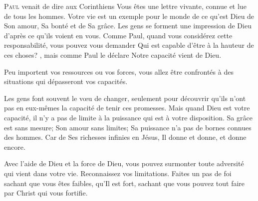 \jrnlmonth




\lettrine{P}{aul} venait de dire aux Corinthiens\frcolon{} 
 \Og Vous êtes une lettre vivante, connue et lue de tous les hommes. \Fg{}
 Votre vie est un exemple pour le monde de ce qu'est Dieu \ocadr de Son amour,
 Sa bonté et de Sa grâce.
 Les gens se forment une impression de Dieu d'après ce qu'ils voient en vous.
 Comme Paul, quand vous considérez cette responsabilité, 
 vous pouvez vous demander\frcolon{} 
 \Og Qui est capable d'être à la hauteur de ces choses? \Fg{},
 mais  comme Paul le déclare\frcolon{} 
 \Og Notre capacité vient de Dieu. \Fg{}

Peu importent vos ressources ou vos forces,
 vous allez être confrontés à des situations qui dépasseront vos capacités.


Les gens font souvent le v\oe{}u de changer, seulement pour découvrir
 qu'ils n'ont pas en eux-mêmes la capacité de tenir ces promesses.
 Mais quand Dieu est votre capacité, il n'y a pas de limite à la puissance
 qui est à votre disposition.
 Sa grâce est sans mesure; Son amour sans limites;
 Sa puissance n'a pas de bornes connues des hommes.
 Car de Ses richesses infinies en Jésus, Il donne et donne, et donne encore.

Avec l'aide de Dieu et la force de Dieu, vous pouvez surmonter
 toute adversité qui vient dans votre vie. Reconnaissez vos limitations.
 Faites un pas de foi sachant que vous êtes faibles, qu'Il est fort,
 sachant que vous pouvez tout faire par Christ qui vous fortifie.

\dvrule



